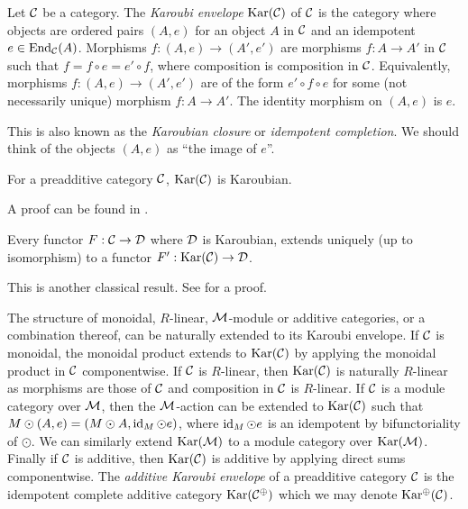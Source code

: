 \begin{definition}
    Let $\mathcal{C}$ be a category. The \textit{Karoubi envelope} $\operatorname{Kar}(\mathcal{C})$ of $\mathcal{C}$ is the category where objects are ordered pairs $(A,e)$ for an object $A$ in $\mathcal{C}$ and an idempotent $e \in \operatorname{End}_{\mathcal{C}}(A)$.  Morphisms $f: (A, e) \to (A', e')$ are morphisms $f:A \to A'$ in $\mathcal{C}$ such that $f = f \circ e = e' \circ f$, where composition is composition in $\mathcal{C}$. Equivalently, morphisms $f: (A, e) \to (A', e')$ are of the form $e'\circ f \circ e$ for some (not necessarily unique) morphism $f: A \to A'$. The identity morphism on $(A,e)$ is $e$.
\end{definition}

This is also known as the \textit{Karoubian closure} or \textit{idempotent completion}. We should think of the objects $(A,e)$ as ``the image of $e$''.

\begin{proposition}
    For a preadditive category $\mathcal{C}$, $\operatorname{Kar}(\mathcal{C})$ is Karoubian.
\end{proposition}

A proof can be found in \cite[Lemma 11.17]{intro-soergel-bimodules}.

\begin{lemma}
    Every functor $F: \mathcal{C} \to \mathcal{D}$ where $\mathcal{D}$ is Karoubian, extends uniquely (up to isomorphism) to a functor $F': \operatorname{Kar}(\mathcal{C}) \to \mathcal{D}$.
\end{lemma}

This is another classical result. See \cite[Proposition 6.5.9 (1)]{borceux-categorical-algebra} for a proof.

The structure of monoidal, $R$-linear, $\mathcal{M}$-module or additive categories, or a combination thereof, can be naturally extended to its Karoubi envelope. If $\mathcal{C}$ is monoidal, the monoidal product extends to $\operatorname{Kar}(\mathcal{C})$ by applying the monoidal product in $\mathcal{C}$ componentwise. If $\mathcal{C}$ is $R$-linear, then $\operatorname{Kar}(\mathcal{C})$ is naturally $R$-linear as morphisms are those of $\mathcal{C}$ and composition in $\mathcal{C}$ is $R$-linear. If $\mathcal{C}$ is a module category over $\mathcal{M}$, then the $\mathcal{M}$-action can be extended to $\operatorname{Kar}(\mathcal{C})$ such that $M \odot (A,e) = (M \odot A, \operatorname{id}_M \odot e)$, where $\operatorname{id}_M \odot e$ is an idempotent by bifunctoriality of $\odot$. We can similarly extend $\operatorname{Kar}(\mathcal{M})$ to a module category over $\operatorname{Kar}(\mathcal{M})$. Finally if $\mathcal{C}$ is additive, then $\operatorname{Kar}(\mathcal{C})$ is additive by applying direct sums componentwise. The \textit{additive Karoubi envelope} of a preadditive category $\mathcal{C}$ is the idempotent complete additive category $\operatorname{Kar}(\mathcal{C}^\oplus)$ which we may denote $\operatorname{Kar^\oplus}(\mathcal{C})$.

